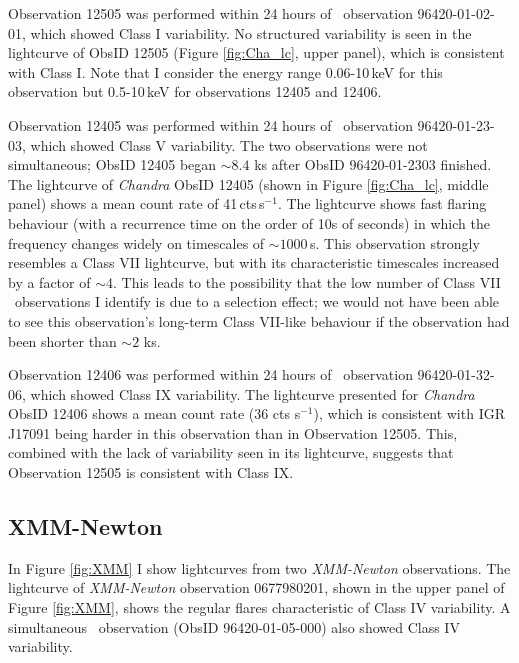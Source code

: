 \par Observation 12505 was performed within 24 hours of \rxte\ observation 96420-01-02-01, which showed Class I variability.  No structured variability is seen in the lightcurve of ObsID 12505 (Figure \ref{fig:Cha_lc}, upper panel), which is consistent with Class I.  Note that I consider the energy range 0.06-10\,keV for this observation but 0.5-10\,keV for observations 12405 and 12406.
\par Observation 12405 was performed within 24 hours of \rxte\ observation 96420-01-23-03, which showed Class V variability.  The two observations were not simultaneous; ObsID 12405 began $\sim8.4$ ks after ObsID 96420-01-2303 finished.  The lightcurve of \textit{Chandra} ObsID 12405 (shown in Figure \ref{fig:Cha_lc}, middle panel) shows a mean count rate of 41\,cts\,s$^{-1}$.  The lightcurve shows fast flaring behaviour (with a recurrence time on the order of 10s of seconds) in which the frequency changes widely on timescales of $\sim1000$\,s.  This observation strongly resembles a Class VII lightcurve, but with its characteristic timescales increased by a factor of $\sim4$.  This leads to the possibility that the low number of Class VII \rxte\ observations I identify is due to a selection effect; we would not have been able to see this observation's long-term Class VII-like behaviour if the observation had been shorter than $\sim2$ ks.
\par Observation 12406 was performed within 24 hours of \rxte\ observation 96420-01-32-06, which showed Class IX variability.  The lightcurve presented for \textit{Chandra} ObsID 12406 shows a mean count rate (36 cts s$^{-1}$), which is consistent with IGR J17091 being harder in this observation than in Observation 12505.  This, combined with the lack of variability seen in its lightcurve, suggests that Observation 12505 is consistent with Class IX.

\subsection{XMM-Newton}

\par In Figure \ref{fig:XMM} I show lightcurves from two \textit{XMM-Newton} observations.  The lightcurve of \textit{XMM-Newton} observation 0677980201, shown in the upper panel of Figure \ref{fig:XMM}, shows the regular flares characteristic of Class IV variability.  A simultaneous \rxte\ observation (ObsID 96420-01-05-000) also showed Class IV variability.

